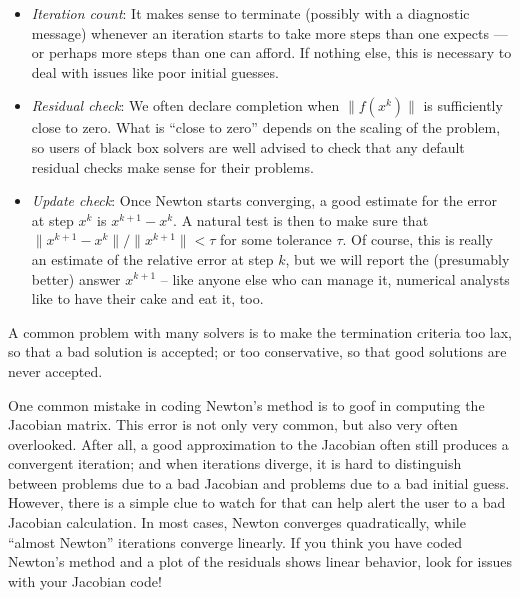 \documentclass[12pt, leqno]{article} %
\begin{document}
\begin{itemize}
\item
  \emph{Iteration count}: It makes sense to terminate (possibly with a
  diagnostic message) whenever an iteration starts to take more steps
  than one expects --- or perhaps more steps than one can afford. If
  nothing else, this is necessary to deal with issues like poor initial
  guesses.
\item
  \emph{Residual check}: We often declare completion when \(\|f(x^k)\|\)
  is sufficiently close to zero. What is ``close to zero'' depends on
  the scaling of the problem, so users of black box solvers are well
  advised to check that any default residual checks make sense for their
  problems.
\item
  \emph{Update check}: Once Newton starts converging, a good estimate
  for the error at step \(x^k\) is \(x^{k+1}-x^k\). A natural test is
  then to make sure that \(\|x^{k+1}-x^k\|/\|x^{k+1}\| < \tau\) for some
  tolerance \(\tau\). Of course, this is really an estimate of the
  relative error at step \(k\), but we will report the (presumably
  better) answer \(x^{k+1}\) -- like anyone else who can manage it,
  numerical analysts like to have their cake and eat it, too.
\end{itemize}

A common problem with many solvers is to make the termination criteria
too lax, so that a bad solution is accepted; or too conservative, so
that good solutions are never accepted.

One common mistake in coding Newton's method is to goof in computing the
Jacobian matrix. This error is not only very common, but also very often
overlooked. After all, a good approximation to the Jacobian often still
produces a convergent iteration; and when iterations diverge, it is hard
to distinguish between problems due to a bad Jacobian and problems due
to a bad initial guess. However, there is a simple clue to watch for
that can help alert the user to a bad Jacobian calculation. In most
cases, Newton converges quadratically, while ``almost Newton''
iterations converge linearly. If you think you have coded Newton's
method and a plot of the residuals shows linear behavior, look for
issues with your Jacobian code!
\end{document}
